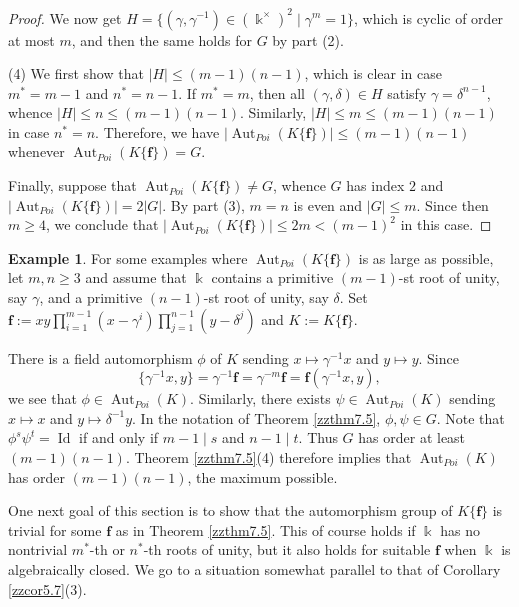 \documentclass[12pt]{amsart}
\theoremstyle{plain}
\numberwithin{theorem}{section}
\numberwithin{equation}{theorem}
\theoremstyle{definition}
\newtheorem{example}[theorem]{Example}
\DeclareMathOperator{\Aut}{Aut}
\newcommand \bff {{\mathbf{f}}}
\newcommand \kx {\Bbbk^\times}
\DeclareMathOperator{\Id}{Id}
\begin{document}
\begin{proof}
We now get $H = \{ (\gamma,\gamma^{-1}) \in (\kx)^2 \mid \gamma^m = 1 \}$, which is cyclic of order at most $m$, and then the same holds for $G$ by part (2).

(4)  We first show that $|H| \le (m-1)(n-1)$, which is clear in case $m^* = m-1$ and $n^* = n-1$.
If $m^* = m$, then all $(\gamma,\delta) \in H$ satisfy $\gamma = \delta^{n-1}$, whence $|H| \le n \le (m-1)(n-1)$.  Similarly, $|H| \le m \le (m-1)(n-1)$ in case $n^* = n$.  Therefore, we have $|{\Aut_{Poi}}(K\{\bff\})| \le (m-1)(n-1)$ whenever $\Aut_{Poi}(K\{\bff\}) = G$.

Finally, suppose that $\Aut_{Poi}(K\{\bff\}) \ne G$, whence $G$ has index $2$ and $|{\Aut_{Poi}}(K\{\bff\})| = 2 |G|$.  By part (3), $m=n$ is even and $|G| \le m$.  Since then $m \ge 4$, we conclude that $|{\Aut_{Poi}}(K\{\bff\})| \le 2m < (m-1)^2$ in this case.
\end{proof}

\begin{example}  \label{zzexa7.6}  
For some examples where $\Aut_{Poi}(K\{\bff\})$ is as large as possible, let $m,n \ge 3$ and assume that $\Bbbk$ contains a primitive $(m-1)$-st root of unity, say $\gamma$, and a primitive $(n-1)$-st root of unity, say $\delta$.  Set $\bff := x y \prod_{i=1}^{m-1} (x - \gamma^i) \prod_{j=1}^{n-1} (y - \delta^j)$ and $K := K\{\bff\}$.  

There is a field automorphism $\phi$ of $K$ sending $x \mapsto \gamma^{-1} x$ and $y \mapsto y$.  Since
$$
\{ \gamma^{-1} x, y \} = \gamma^{-1} \bff = \gamma^{-m} \bff = \bff(\gamma^{-1} x, y),
$$
we see that $\phi \in \Aut_{Poi}(K)$.  Similarly, there exists $\psi \in \Aut_{Poi}(K)$ sending $x \mapsto x$ and $y \mapsto \delta^{-1} y$.  In the notation of Theorem \ref{zzthm7.5}, $\phi,\psi \in G$.  Note that $\phi^s \psi^t = \Id$ if and only if $m-1 \mid s$ and $n-1 \mid t$.  Thus $G$ has order at least $(m-1)(n-1)$.  Theorem \ref{zzthm7.5}(4) therefore implies that $\Aut_{Poi}(K)$ has order $(m-1)(n-1)$, the maximum possible.
\end{example}

One next goal of this section is to show that 
the automorphism group of $K\{\bff\}$  is
trivial for some $\bff$ as in Theorem \ref{zzthm7.5}.  This of course holds if $\Bbbk$ has no nontrivial $m^*$-th or $n^*$-th roots of unity, but it also holds for suitable $\bff$ when $\Bbbk$ is algebraically closed.  We go to a situation somewhat parallel to that of Corollary \ref{zzcor5.7}(3).
\end{document}
